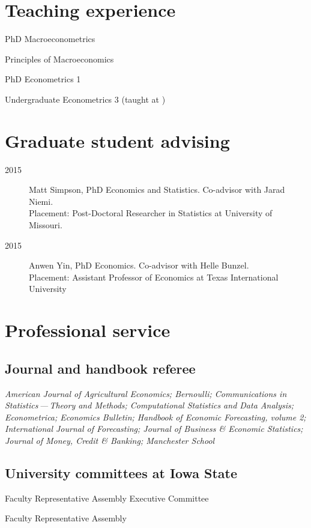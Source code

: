 \documentclass[11pt]{article}%
\newcommand{\allcaps}[1]{\textls{\MakeUppercase{#1}}}
\newcommand{\p}{\rlap{.}}
\begin{document}
\section*{Teaching experience}
\begin{description}[noitemsep]
\item[2011\,--\,present] PhD Macroeconometrics
\item[2010\,--\,present] Principles of Macroeconomics
\item[2009\,--\,present] PhD Econometrics 1
\item[2009\p] Undergraduate Econometrics 3 (taught at \allcaps{UCSD})
\end{description}

\section*{Graduate student advising}
\begin{description}
\item[2015] Matt Simpson, PhD Economics and Statistics.  Co-advisor
with Jarad Niemi. \\
Placement: Post-Doctoral Researcher in Statistics at University of Missouri.
\item[2015] Anwen Yin, PhD Economics. Co-advisor with Helle Bunzel. \\
Placement: Assistant Professor of Economics at Texas 
International University
\end{description}

\section*{Professional service}

\subsection*{Journal and handbook referee}
\textit{American Journal of Agricultural Economics;
Bernoulli;
Communications in Statistics\,---\,Theory and Methods;
Computational Statistics and Data Analysis;
Econometrica;
Economics Bulletin;
Handbook of Economic Forecasting, volume 2;
International Journal of Forecasting;
Journal of Business \& Economic Statistics;
Journal of Money, Credit \& Banking;
Manchester School}

\subsection*{University committees at Iowa State}
\begin{description}[noitemsep]
\item[2014\,--\,present] Faculty Representative Assembly Executive
Committee
\item[2013\,--\,present] Faculty Representative Assembly
\end{description}
\end{document}
